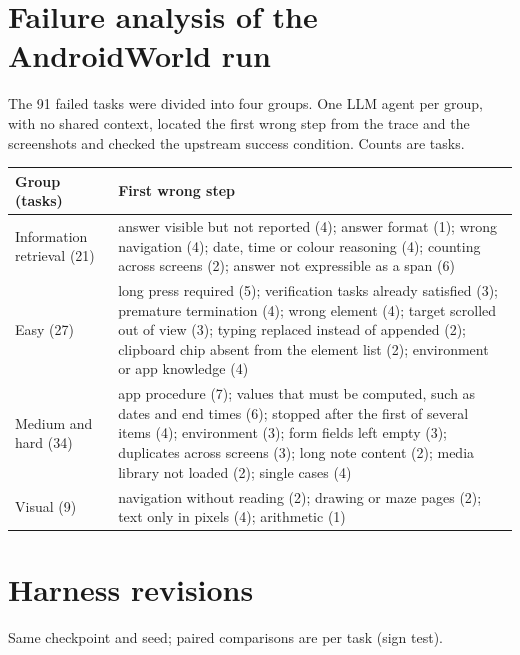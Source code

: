 \documentclass{article}
\begin{document}



\newpage
\appendix
\onecolumn

\section{Failure analysis of the AndroidWorld run}
\label{app:failures}
The 91 failed tasks were divided into four groups. One LLM agent per group, with no shared context, located the
first wrong step from the trace and the screenshots and checked the upstream success condition. Counts are tasks.

\begin{table}[h]
\centering
\small
\begin{tabular}{@{}l L{13.0cm}@{}}
\toprule
Group (tasks) & First wrong step \\
\midrule
Information retrieval (21) & answer visible but not reported (4); answer format (1); wrong navigation (4); date, time or colour reasoning (4); counting across screens (2); answer not expressible as a span (6) \\
Easy (27) & long press required (5); verification tasks already satisfied (3); premature termination (4); wrong element (4); target scrolled out of view (3); typing replaced instead of appended (2); clipboard chip absent from the element list (2); environment or app knowledge (4) \\
Medium and hard (34) & app procedure (7); values that must be computed, such as dates and end times (6); stopped after the first of several items (4); environment (3); form fields left empty (3); duplicates across screens (3); long note content (2); media library not loaded (2); single cases (4) \\
Visual (9) & navigation without reading (2); drawing or maze pages (2); text only in pixels (4); arithmetic (1) \\
\bottomrule
\end{tabular}
\end{table}

\section{Harness revisions}
\label{app:harness}
Same checkpoint and seed; paired comparisons are per task (sign test).
\end{document}
